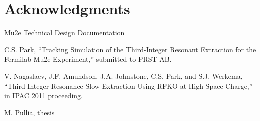 \documentclass[aps,prstab,onecolumn,preprint,endfloats,11pt]{revtex4-1}
\begin{document}
\section{\label{thanks}Acknowledgments}

\begin{thebibliography}{77}

  Mu2e Technical Design Documentation

  C.S. Park, ``Tracking Simulation of the Third-Integer Resonant Extraction for the Fermilab Mu2e Experiment,'' submitted to PRST-AB.

  V. Nagaslaev, J.F. Amundson, J.A. Johnstone, C.S. Park, and S.J. Werkema, ``Third Integer Resonance Slow Extraction Using RFKO at High Space Charge,'' in IPAC 2011 proceeding.

  M. Pullia, thesis

\end{thebibliography}

\clearpage
\end{document}
